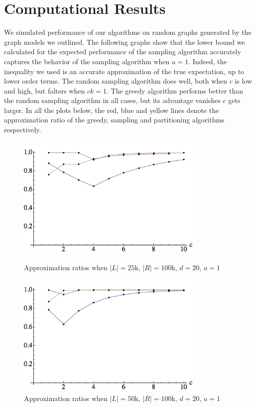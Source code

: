 \section{Computational Results}

We simulated performance of our algorithms on random graphs generated by the
graph models we outlined. The following graphs show that the lower bound we
calculated for the expected performance of the sampling algorithm accurately
captures the behavior of the sampling algorithm when $a=1$. Indeed, the
inequality we used is an accurate approximation of the true expectation, up to
lower order terms. The random sampling algorithm does well, both when $c$ is low
and high, but falters when $ck=1$. The greedy algorithm performs better than the
random sampling algorithm in all cases, but its advantage vanishes $c$ gets
larger. In all the plots below, the red, blue and yellow lines denote the
approximation ratio of the greedy, sampling and partitioning algorithms
respectively.

\begin{figure}[h]
\centering
\begin{minipage}[h]{0.45\textwidth}
\centering
\includegraphics[width=0.8\textwidth]{images/l=25000,r=100000_Greedy_vs_Naive.png}
\caption{Approximation ratios when $|L|=25$k, $|R|=100$k, $d=20$, $a=1$}
\end{minipage}
\hspace{0.2cm}
\begin{minipage}[h]{0.45\textwidth}
\centering
\includegraphics[width=0.8\textwidth]{images/l=50000,r=100000_Greedy_vs_Naive.png}
\caption{Approximation ratios when $|L|=50$k, $|R|=100$k, $d=20$, $a=1$}
\end{minipage}
\end{figure}

